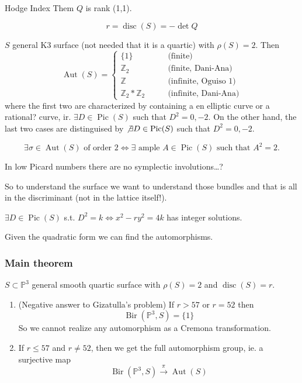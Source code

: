 \begin{remark}
	Hodge Index Them $Q$ is rank (1,1).
\end{remark}

\begin{defn}[Discriminant]
	\[r=\operatorname{disc}(S)=-\det Q\]
\end{defn}

\begin{prop}
	$S$ general K3 surface (not needed that it is a quartic) with $\rho(S)=2$. Then
	\[\operatorname{Aut}(S)=\begin{cases}
		\{1\}\qquad &\text{(finite)}  \\
		\mathbb{Z}_2\qquad &\text{(finite, Dani-Ana)} \\
		\mathbb{Z}\qquad&\text{(infinite, Oguiso 1)}  \\
		\mathbb{Z}_2*\mathbb{Z}_2\qquad &\text{(infinite, Dani-Ana)} 
	\end{cases}\]
	where the first two are characterized by containing a en elliptic curve or a rational? curve, ir. $\exists D\in\operatorname{Pic}(S)$ such that $D^2=0,-2$. On the other hand, the last two cases are distinguised by $\not\exists D\in\operatorname{Pic}(S)$ such that $D^2=0,-2$.

	\[\exists \sigma\in\operatorname{Aut}(S)\text{ of order 2}\iff \exists  \text{ ample }A\in\operatorname{Pic}(S) \text{ such that }A^2=2.\]
\end{prop}

\begin{remark}
	In low Picard numbers there are no symplectic involutions…?
\end{remark}

So to understand the surface we want to understand those bundles and that is all in the discriminant (not in the lattice itself!).

\begin{remark}
	$\exists D\in\operatorname{Pic}(S)$ s.t. $D^2=k \iff x^2-ry^2=4k$  has integer solutions.
\end{remark}

Given the quadratic form we can find the automorphisms.

\subsubsection{Main theorem}

\begin{thm}\leavevmode
	$S\subset \mathbb{P}^3$ general smooth quartic surface with $\rho(S)=2$ and $\operatorname{disc}(S)=r$.
\begin{enumerate}
	\item (Negative answer to Gizatulla's problem) If $r>57$ or  $r=52$ then
		 \[\operatorname{Bir}(\mathbb{P}^3,S)=\{1\}\]
		 So we cannot realize any automorphism as a Cremona transformation.

	\item If $r\leq 57$ and $r \neq 52$, then we get the full automorphism group, ie. a surjective map
		\[\operatorname{Bir}(\mathbb{P}^3,S)\overset{\pi}{\longrightarrow}\operatorname{Aut}(S)\]
\end{enumerate}
\end{thm}

